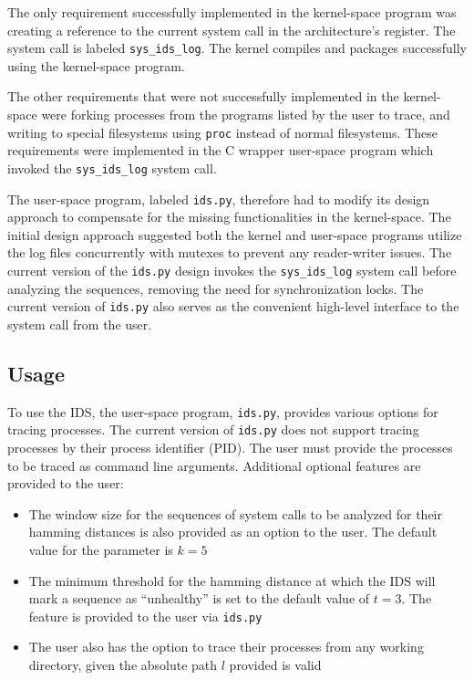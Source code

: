 \documentclass[paper=usletter, fontsize=12pt]{article}
\begin{document}
    The only requirement successfully implemented in the kernel-space program
    was creating a reference to the current system call in the architecture's
    register. The system call is labeled \texttt{sys\_ids\_log}. The kernel
    compiles and packages successfully using the kernel-space program.

    The other requirements that were not successfully implemented in the
    kernel-space were forking processes from the programs listed by the user to
    trace, and writing to special filesystems using \texttt{proc} instead of
    normal filesystems. These requirements were implemented in the C wrapper
    user-space program which invoked the \texttt{sys\_ids\_log} system call.

    The user-space program, labeled \texttt{ids.py}, therefore had to modify
    its design approach to compensate for the missing functionalities in the
    kernel-space. The initial design approach suggested both the kernel and
    user-space programs utilize the log files concurrently with mutexes to
    prevent any reader-writer issues. The current version of the
    \texttt{ids.py} design invokes the \texttt{sys\_ids\_log} system call
    before analyzing the sequences, removing the need for synchronization
    locks. The current version of \texttt{ids.py} also serves as the convenient
    high-level interface to the system call from the user.

    \subsection{Usage} To use the IDS, the user-space program, \texttt{ids.py},
    provides various options for tracing processes. The current version of
    \texttt{ids.py} does not support tracing processes by their process
    identifier (PID). The user must provide the processes to be traced as
    command line arguments. Additional optional features are provided to the
    user:
    \begin{itemize}

        \item The window size for the sequences of system calls to be analyzed
        for their hamming distances is also provided as an option to the user.
        The default value for the parameter is $k=5$

        \item The minimum threshold for the hamming distance at which the IDS
        will mark a sequence as ``unhealthy'' is set to the default value of
        $t=3$. The feature is provided to the user via \texttt{ids.py}

        \item The user also has the option to trace their processes from any
        working directory, given the absolute path $l$ provided is valid

    \end{itemize}
\end{document}
